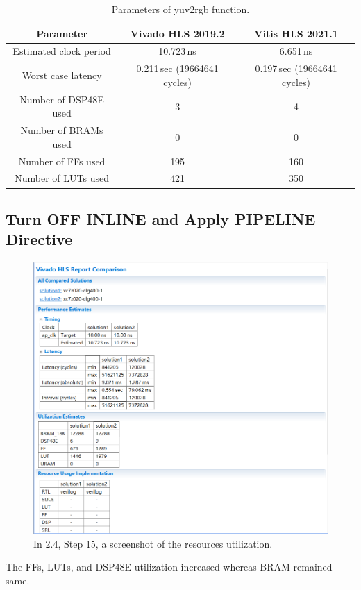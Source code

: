 \documentclass[a4paper]{article}
\begin{document}
\begin{table}[H]
    \centering
    \begin{tabular}{|c|c|c|}
        \hline
        Parameter&Vivado HLS 2019.2&Vitis HLS 2021.1\\
        \hline
        Estimated clock period&10.723\,ns&6.651\,ns\\
        \hline
        Worst case latency&0.211\,sec (19664641 cycles)&0.197\,sec (19664641 cycles)\\
        \hline
        Number of DSP48E used&3&4\\
        \hline
        Number of BRAMs used&0&0\\
        \hline
        Number of FFs used&195&160\\
        \hline
        Number of LUTs used&421&350\\
        \hline
    \end{tabular}
    \caption{Parameters of yuv2rgb function.}
\end{table}
\subsection{Turn OFF INLINE and Apply PIPELINE Directive}


\begin{figure}[H]
    \centering
    \includegraphics[width=1\textwidth]{4.png}
    \caption{In 2.4, Step 15, a screenshot of the resources utilization.}
\end{figure}
The FFs, LUTs, and DSP48E utilization increased whereas BRAM remained same.
\end{document}
